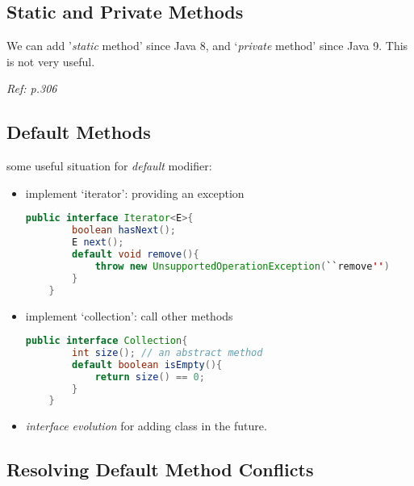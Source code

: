 \documentclass[12pt]{article}
\begin{document}
\subsection{Static and Private Methods}
We can add '\emph{static} method' since Java 8, and `\emph{private} method' since Java 9.
This is not very useful.

\textit{Ref: p.306}

\subsection{Default Methods}
some useful situation for \emph{default} modifier:
\begin{itemize}
    \item implement `iterator': providing an exception
    \begin{lstlisting}[language=Java]
    public interface Iterator<E>{
        boolean hasNext();
        E next();
        default void remove(){
            throw new UnsupportedOperationException(``remove'')
        }
    }
    \end{lstlisting}
    \item implement `collection': call other methods
    \begin{lstlisting}[language=Java]
    public interface Collection{
        int size(); // an abstract method
        default boolean isEmpty(){
            return size() == 0;
        }
    }
    \end{lstlisting}
    \item \emph{interface evolution} for adding class in the future.
\end{itemize} 

\subsection{Resolving Default Method Conflicts}
\end{document}
